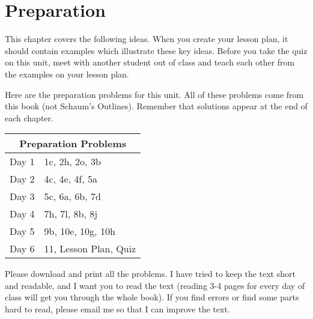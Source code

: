 \newpage

\section{Preparation}

\noindent
This chapter covers the following ideas. When you create your lesson plan, it should contain examples which illustrate these key ideas. Before you take the quiz on this unit, meet with another student out of class and teach each other from the examples on your lesson plan. 



Here are the preparation problems for this unit.  All of these problems come from this book (not Schaum's Outlines).  Remember that solutions appear at the end of each chapter.



\begin{center}
\begin{tabular}{ll}
\multicolumn{2}{c}{Preparation Problems}\\
\hline\hline
Day 1&
1c,
2h,
2o,
3b
\\ \hline
Day 2&
4c,
4e,
4f,
5a
\\ \hline
Day 3&
5c,
6a,
6b,
7d
\\ \hline
Day 4&
7h,
7l,
8b,
8j 
\\ \hline
Day 5&
9b,
10e,
10g,
10h
\\ \hline
Day 6&
11, 
Lesson Plan,
Quiz
\\ \hline
\end{tabular}
\end{center}

Please download and print all the problems. I have tried to keep the text short and readable, and I want you to read the text (reading 3-4 pages for every day of class will get you through the whole book). If you find errors or find some parts hard to read, please email me so that I can improve the text.



